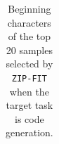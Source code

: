 \begin{table}[htbp]
\begin{tabular}{|p{10cm}|c|}
    \end{tabular}\label{tab:code_top_20_zip_fit}
    \caption{Beginning characters of the top 20 samples selected by \texttt{ZIP-FIT} when the target task is code generation.}
\end{table}

